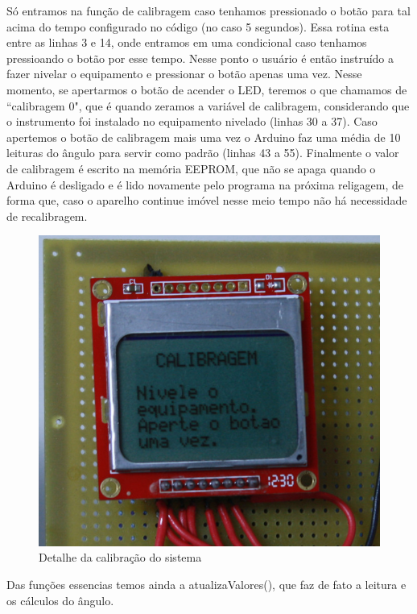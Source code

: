 \documentclass[a4paper,12pt]{article}
\begin{document}
Só entramos na função de calibragem caso tenhamos pressionado o botão para tal acima do tempo configurado no código (no caso 5 segundos). Essa rotina esta entre as linhas 3 e 14, onde entramos em uma condicional caso tenhamos pressioando o botão por esse tempo. Nesse ponto o usuário é então instruído a fazer nivelar o equipamento e pressionar o botão apenas uma vez. Nesse momento, se apertarmos o botão de acender o LED, teremos o que chamamos de ``calibragem 0", que é quando zeramos a variável de calibragem, considerando que o instrumento foi instalado no equipamento nivelado (linhas 30 a 37). Caso apertemos o botão de calibragem mais uma vez o Arduino faz uma média de 10 leituras do ângulo para servir como padrão (linhas 43 a 55). Finalmente o valor de calibragem é escrito na memória EEPROM, que não se apaga quando o Arduino é desligado e é lido novamente pelo programa na próxima religagem, de forma que, caso o aparelho continue imóvel nesse meio tempo não há necessidade de recalibragem.

\begin{figure}[H]
\centering
\includegraphics[width=.5\textwidth]{img/calibra.jpg}
\caption{Detalhe da calibração do sistema}
\label{calibra}
\end{figure}

Das funções essencias temos ainda a atualizaValores(), que faz de fato a leitura e os cálculos do ângulo.
\end{document}
